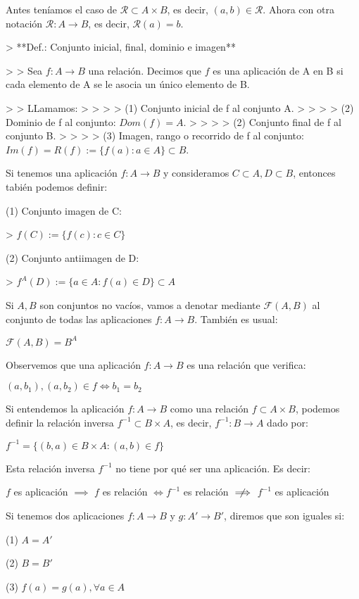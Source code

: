 Antes teníamos el caso de $\mathcal{R} \subset A \times B$, es decir, $(a,b) \in \mathcal{R}$. Ahora con otra notación $\mathcal{R}: A \to B$, es decir, $\mathcal{R}(a) = b$.

> **Def.: Conjunto inicial, final, dominio e imagen**

> > Sea $f: A \to B$ una relación. Decimos que $f$ es una aplicación de A en B si cada elemento de A se le asocia un único elemento de B.

> > LLamamos:
> > 
> > (1) Conjunto inicial de f al conjunto A. 
> > 
> > (2) Dominio de f al conjunto: $Dom(f) = A$.
> > 
> > (2) Conjunto final de f al conjunto B.
> > 
> > (3) Imagen, rango o recorrido de f al conjunto: $Im(f) = R(f) := \{f(a): a \in A\} \subset B$.

Si tenemos una aplicación $f: A \to B$ y consideramos $C \subset A, D \subset B$, entonces tabién podemos definir:

(1) Conjunto imagen de C:

> $f(C) := \{f(c): c \in C\}$

(2) Conjunto antiimagen de D:

> $f^{A}(D) := \{a \in A: f(a) \in D\} \subset A$

Si $A,B$ son conjuntos no vacíos, vamos a denotar mediante $\mathcal{F}(A,B)$ al conjunto de todas las aplicaciones $f: A \to B$. También es usual:

$\mathcal{F}(A,B) = B^A$

Observemos que una aplicación $f: A \to B$ es una relación que verifica:

$(a,b_1), (a,b_2) \in f \iff b_1 = b_2$

Si entendemos la aplicación $f: A \to B$ como una relación $f \subset A \times B$, podemos definir la relación inversa $f^{-1} \subset B \times A$, es decir, $f^{-1}: B \to A$ dado por:

$f^{-1} = \{(b,a) \in B \times A: (a,b) \in f\}$

Esta relación inversa $f^{-1}$ no tiene por qué ser una aplicación. Es decir:

$f$ es aplicación $\implies$ $f$ es relación $\iff f^{-1}$ es relación $\centernot\implies$ $f^{-1}$ es aplicación

Si tenemos dos aplicaciones $f: A \to B$ y $g: A' \to B'$, diremos que son iguales si:

(1) $A = A'$

(2) $B = B'$

(3) $f(a) = g(a), \forall a \in A$

